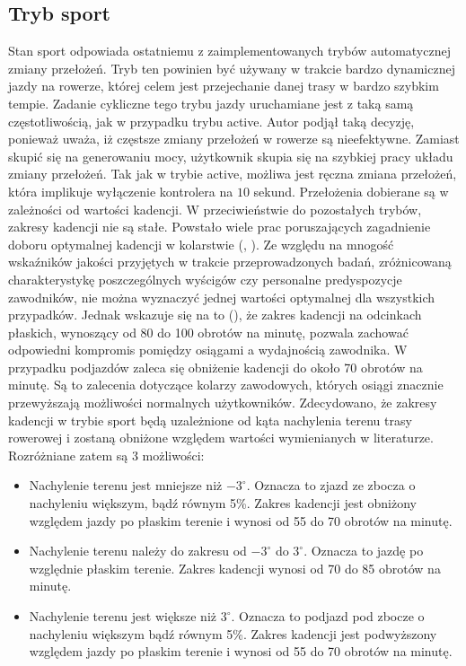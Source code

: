 \subsection{Tryb sport}  
Stan sport odpowiada ostatniemu z zaimplementowanych trybów automatycznej zmiany przełożeń. Tryb ten powinien być używany w trakcie bardzo dynamicznej jazdy na rowerze, której celem jest przejechanie danej trasy w bardzo szybkim tempie. Zadanie cykliczne tego trybu jazdy uruchamiane jest z taką samą częstotliwością, jak w przypadku trybu active. Autor podjął taką decyzję, ponieważ uważa, iż częstsze zmiany przełożeń w rowerze są nieefektywne. Zamiast skupić się na generowaniu mocy, użytkownik skupia się na szybkiej pracy układu zmiany przełożeń. Tak jak w trybie active, możliwa jest ręczna zmiana przełożeń, która implikuje wyłączenie kontrolera na $10$ sekund. Przełożenia dobierane są w zależności od wartości kadencji. W przeciwieństwie do pozostałych trybów, zakresy kadencji nie są stałe. Powstało wiele prac poruszających zagadnienie doboru optymalnej kadencji w kolarstwie (\cite{cuttingEdge}, \cite{optCadence}). Ze względu na mnogość wskaźników jakości przyjętych w trakcie przeprowadzonych badań, zróżnicowaną charakterystykę poszczególnych wyścigów czy personalne predyspozycje zawodników, nie można wyznaczyć jednej wartości optymalnej dla wszystkich przypadków. Jednak wskazuje się na to (\cite{cuttingEdge}), że zakres kadencji na odcinkach płaskich, wynoszący od 80 do 100 obrotów na minutę, pozwala zachować odpowiedni kompromis pomiędzy osiągami a wydajnością zawodnika. W przypadku podjazdów zaleca się obniżenie kadencji do około 70 obrotów na minutę. Są to zalecenia dotyczące kolarzy zawodowych, których osiągi znacznie przewyższają możliwości normalnych użytkowników. Zdecydowano, że zakresy kadencji w trybie sport będą uzależnione od kąta nachylenia terenu trasy rowerowej i zostaną obniżone względem wartości wymienianych w literaturze. Rozróżniane zatem są 3 możliwości:
\begin{itemize}
\item
Nachylenie terenu jest mniejsze niż $-3^{\circ}$. Oznacza to zjazd ze zbocza o nachyleniu większym, bądź równym 5\%. Zakres kadencji jest obniżony względem jazdy po płaskim terenie i wynosi od 55 do 70 obrotów na minutę.
\item
    Nachylenie terenu należy do zakresu od $-3^{\circ}$ do $3^{\circ}$. Oznacza to jazdę po względnie płaskim terenie. Zakres kadencji wynosi od 70 do 85 obrotów na minutę.
\item
Nachylenie terenu jest większe niż $3^{\circ}$. Oznacza to podjazd pod zbocze o nachyleniu większym bądź równym 5\%. Zakres kadencji jest podwyższony względem jazdy po płaskim terenie i wynosi od 55 do 70 obrotów na minutę.

\end{itemize}
